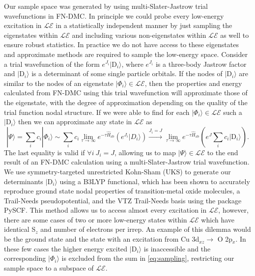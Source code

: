 \documentclass{article}
\begin{document}
Our sample space was generated by using multi-Slater-Jastrow trial wavefunctions in FN-DMC. 
In principle we could probe every low-energy excitation in $\mathcal{LE}$ in a statistically independent manner by just sampling the eigenstates within $\mathcal{LE}$ and including various non-eigenstates within $\mathcal{LE}$ as well to ensure robust statistics.
In practice we do not have access to these eigenstates and approximate methods are required to sample the low-energy space. 
Consider a trial wavefunction of the form $e^{J_i} |\text{D}_i\rangle$, where $e^{J_i}$ is a three-body Jastrow factor and $|\text{D}_i\rangle$ is a determinant of some single particle orbitals.
If the nodes of $|\text{D}_i\rangle$ are similar to the nodes of an eigenstate $|\Phi_i\rangle \in \mathcal{LE}$, then the properties and energy calculated from FN-DMC using this trial wavefunction will approximate those of the eigenstate, with the degree of approximation depending on the quality of the trial function nodal structure.
If we were able to find for each $|\Phi_i \rangle \in \mathcal{LE}$ such a $|\text{D}_i\rangle$ then we can approximate any state in $\mathcal{LE}$ as
\begin{equation}
|\Psi\rangle = \sum_i c_i |\Phi_i\rangle \sim \sum_i c_i \lim_{\tau \rightarrow \infty} e^{-\tau \hat{H}_\text{ab}} (e^{J_i} |D_i\rangle) \xrightarrow{J_i = J} \lim_{\tau \rightarrow \infty} e^{-\tau \hat{H}_\text{ab}} (e^{J}\sum_{i} c_i|\text{D}_i\rangle).
\label{eq:sampling}
\end{equation}
The last equality is valid if $\forall i\  J_i = J$, allowing us to map $|\Psi \rangle \in \mathcal{LE}$ to the end result of an FN-DMC calculation using a multi-Slater-Jastrow trial wavefunction. 
We use symmetry-targeted unrestricted Kohn-Sham (UKS) to generate our determinants $|\text{D}_i\rangle$ using a B3LYP functional, which has been shown to accurately reproduce ground state nodal properties of transition-metal oxide molecules, a Trail-Needs pseudopotential, and the VTZ Trail-Needs basis using the package PySCF.
This method allows us to access almost every excitation in $\mathcal{LE}$, however, there are some cases of two or more low-energy states within $\mathcal{LE}$ which have identical S$_z$ and number of electrons per irrep.
An example of this dilemma would be the ground state and the state with an excitation from Cu 3d$_{xz} \rightarrow $  O 2p$_x$.
In these few cases the higher energy excited $|\text{D}_i\rangle$ is inaccessible and the corresponding $|\Phi_i\rangle$ is excluded from the sum in \eqref{eq:sampling}, restricting our sample space to a subspace of $\mathcal{LE}$.
\end{document}
